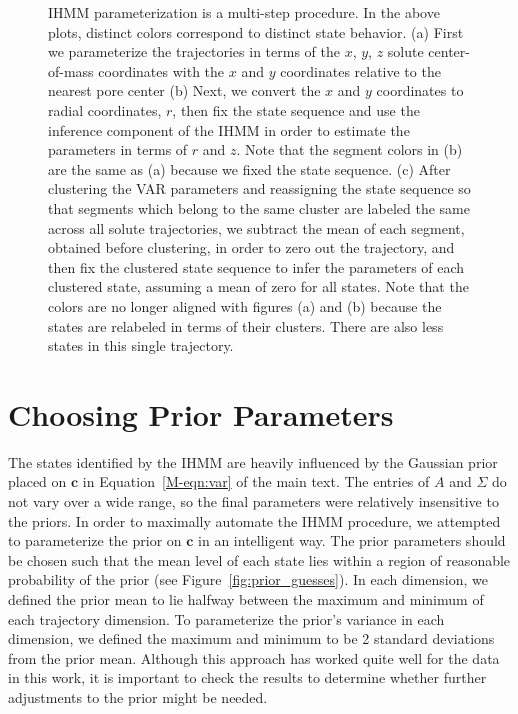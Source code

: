 \documentclass{article}
\begin{document}
\begin{figure}
\begin{subfigure}{0.6\textwidth}
		\caption{}\label{fig:zeroed_clustered_hmm}
	\end{subfigure}  
	\caption{IHMM parameterization is a multi-step procedure. In the above plots, distinct colors
	correspond to distinct state behavior. (a) First we parameterize the trajectories in terms of
	the $x$, $y$, $z$ solute center-of-mass coordinates with the $x$ and $y$ coordinates relative
	to the nearest pore center (b) Next, we convert the $x$ and $y$ 	
	coordinates to radial coordinates, $r$, then fix the state sequence and use the inference 
	component of the IHMM in order to estimate the parameters in terms of $r$ and $z$. Note that
	the segment colors in (b) are the same as (a) because we fixed the state sequence.
	(c) After clustering the VAR parameters and reassigning the state sequence so that segments 
	which belong to the same cluster are labeled the same across all solute trajectories, we subtract
	the mean of each segment, obtained before clustering, in order to zero out the
  	trajectory, and then fix the clustered state sequence to infer the parameters of each clustered 
  	state, assuming a mean of zero for all states. Note that the colors are no longer aligned with 
  	figures (a) and (b) because the states are relabeled in terms of their clusters. There are
  	also less states in this single trajectory.
	}\label{fig:hmm_demo}
  \end{figure}
  
  \newpage
  
  \section{Choosing Prior Parameters}\label{section:prior_guesses}  
  
  The states identified by the IHMM are heavily influenced by the Gaussian prior
  placed on $\mathbf{c}$ in Equation~\ref{M-eqn:var} of the main text. The 
  entries of $A$ and $\Sigma$ do not vary over a wide range, so the final
  parameters were relatively insensitive to the priors. In order to 
  maximally automate the IHMM procedure, we attempted to parameterize the
  prior on $\mathbf{c}$ in an intelligent way. The prior parameters should
  be chosen such that the mean level of each state lies within a region of 
  reasonable probability of the prior (see Figure~\ref{fig:prior_guesses}).
  In each dimension, we defined the prior mean to lie halfway between the 
  maximum and minimum of each trajectory dimension. To parameterize the 
  prior's variance in each dimension, we defined the maximum and minimum to 
  be 2 standard deviations from the prior mean. Although this approach has 
  worked quite well for the data in this work, it is important to check the 
  results to determine whether further adjustments to the prior might be needed.
  
\end{document}
